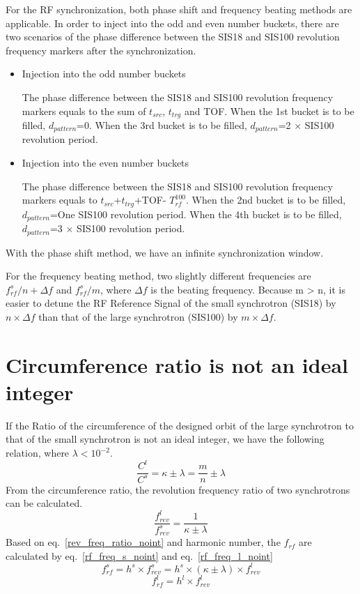 For the RF synchronization, both phase shift and frequency beating methods are applicable. In order to inject into the odd and even number buckets, there are two scenarios of the phase difference between the SIS18 and SIS100 revolution frequency markers after the synchronization.
\begin{itemize}
	\item Injection into the odd number buckets
		
		The phase difference between the SIS18 and SIS100 revolution frequency markers equals to the sum of $t_{src}$, $t_{trg}$ and TOF. When the 1st bucket is to be filled, $d_{pattern}$=0. When the 3rd bucket is to be filled, $d_{pattern}$=2 $\times$ SIS100 revolution period. 
	\item Injection into the even number buckets
	
		The phase difference between the SIS18 and SIS100 revolution frequency markers equals to $t_{src}$+$t_{trg}$+TOF- $T_{rf}^{100}$. When the 2nd bucket is to be filled, $d_{pattern}$=One SIS100 revolution period. When the 4th bucket is to be filled, $d_{pattern}$=3 $\times$ SIS100 revolution period. 

\end{itemize}
With the phase shift method, we have an infinite synchronization window. 

For the frequency beating method, two slightly different frequencies are $f_{rf}^{s}/n+\Delta f$ and $f_{rf}^{s}/m$, where $\Delta f$ is the beating frequency. Because m > n, it is easier to detune the RF Reference Signal of the small synchrotron (SIS18) by $n\times\Delta f$ than that of the large synchrotron (SIS100) by $m\times\Delta f$.

\section{ Circumference ratio is not an ideal integer}
If the Ratio of the circumference of the designed orbit of the large synchrotron to that of the small synchrotron is not an ideal integer, we have the following relation, where $\lambda<10^{-2}$.
\begin{equation}
\frac{C^l}{C^s}=\kappa \pm \lambda = \frac{m}{n}\pm \lambda \label{circumference_ratio_noint}
\end{equation}
From the circumference ratio, the revolution frequency ratio of two synchrotrons can be calculated.
\begin{equation}
\frac{f_{rev}^{l}}{f_{rev}^{s}}=\frac{1}{\kappa\pm \lambda} \label{rev_freq_ratio_noint}
\end{equation}
Based on eq.~\ref{rev_freq_ratio_noint} and harmonic number, the $f_{rf}$ are calculated by eq.~\ref{rf_freq_s_noint} and eq.~\ref{rf_freq_l_noint}
\begin{equation} 
f_{rf}^{s}= h^s \times f_{rev}^{s}=h^s \times (\kappa\pm \lambda) \times f_{rev}^{l} \label{rf_freq_s_noint}
\end{equation}
\begin{equation} 
f_{rf}^{l}= h^l \times f_{rev}^{l} \label{rf_freq_l_noint}
\end{equation}
